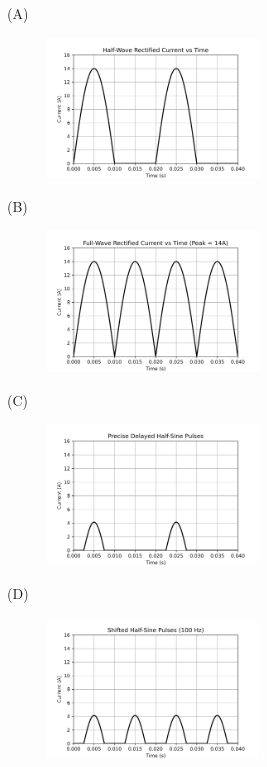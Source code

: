 \documentclass[12pt]{article}
\begin{document}
\begin{enumerate}
\begin{multicols}{2}
(A) \begin{figure}[H]
  \centering
  \includegraphics[width=0.5\textwidth]{figs/half_wave_rectified.png}
  \caption{}
\end{figure}

(B) \begin{figure}[H]
  \centering
  \includegraphics[width=0.5\textwidth]{figs/full_wave_peak_14A.png}
  \caption{}
\end{figure}

(C) \begin{figure}[H]
  \centering
  \includegraphics[width=0.5\textwidth]{figs/precise_half_sine_pulses.png}
  \caption{}
\end{figure}

(D) \begin{figure}[H]
  \centering
  \includegraphics[width=0.5\textwidth]{figs/shifted_half_sine_pulses.png}
  \caption{}
\end{figure}
\end{multicols}


\end{enumerate}
\end{document}
